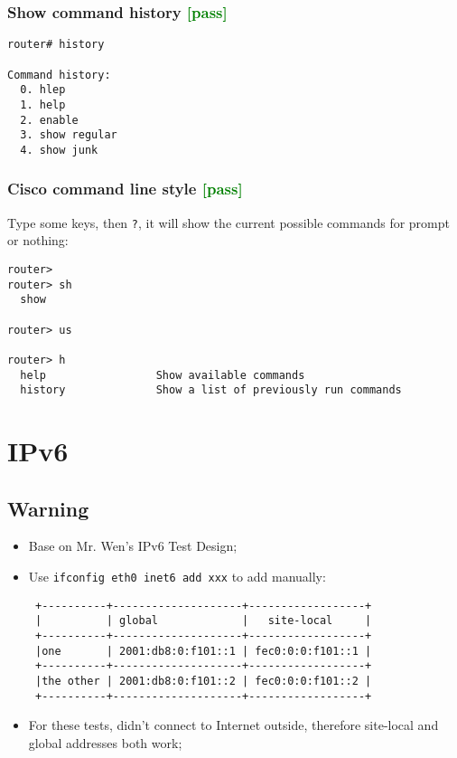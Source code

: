 \documentclass[a4paper]{report}
\begin{document}
\subsection{Show command history \textcolor{green}{[pass]}}
\begin{lstlisting}
router# history     

Command history:
  0. hlep
  1. help
  2. enable
  3. show regular
  4. show junk
\end{lstlisting}
\subsection{Cisco command line style \textcolor{green}{[pass]}}
Type some keys, then {\tt ?}, it will show the current 
possible commands for prompt or nothing:
\begin{lstlisting}
router> 
router> sh
  show                 

router> us 

router> h
  help                 Show available commands
  history              Show a list of previously run commands
\end{lstlisting}

\chapter{IPv6}
\section{Warning}
\begin{itemize}
    \item Base on Mr. Wen's IPv6 Test Design;
    \item Use {\tt ifconfig eth0 inet6 add xxx} to add manually:
\begin{lstlisting}                                   
 +----------+--------------------+------------------+
 |          | global             |   site-local     |
 +----------+--------------------+------------------+
 |one       | 2001:db8:0:f101::1 | fec0:0:0:f101::1 |
 +----------+--------------------+------------------+ 
 |the other | 2001:db8:0:f101::2 | fec0:0:0:f101::2 |
 +----------+--------------------+------------------+
\end{lstlisting}                                     
    \item For these tests, didn't connect to Internet outside, therefore site-local
          and global addresses both work;
\end{itemize}
\end{document}
